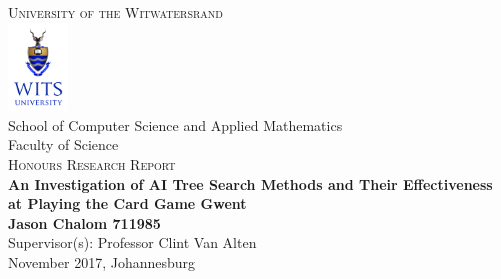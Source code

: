 \begin{titlepage}
\begin{center}
\vspace*{0.5cm}
\textsc{\large University of the Witwatersrand}\\
\includegraphics[width=0.12\textwidth]{../figures/witslogonew.png}~\\[0.2cm]
\large School of Computer Science and Applied Mathematics\\
\large Faculty of Science\\
\textsc{\Large Honours Research Report}\\[1.8cm]
\textbf{\huge {An Investigation of AI Tree Search Methods and Their Effectiveness at Playing the Card Game Gwent}} \\[1.5cm]
\textbf{\Large Jason Chalom 711985} \\[7cm]
\vfill 
Supervisor(s): Professor Clint Van Alten\\[1cm]

{\normalsize {November 2017, Johannesburg}}
\end{center}
\end{titlepage}
